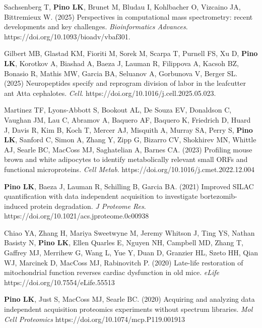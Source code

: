 \documentclass[11pt]{article}
\begin{document}
\begin{etaremune}

    \item Sachsenberg T, \textbf{Pino LK}, Brunet M, Bludau I, Kohlbacher O, Vizcaino JA, Bittremieux W. (2025) Perspectives in computational mass spectrometry: recent developments and key challenges. \textit{Bioinformatics Advances}. https://doi.org/10.1093/bioadv/vbaf301.

    \item Gilbert MB, Glastad KM, Fioriti M, Sorek M, Scarpa T, Purnell FS, Xu D, \textbf{Pino LK}, Korotkov A, Biashad A, Baeza J, Lauman R, Filippova A, Kacsoh BZ, Bonasio R, Mathis MW, Garcia BA, Seluanov A, Gorbunova V, Berger SL. (2025) Neuropeptides specify and reprogram division of labor in the leafcutter ant Atta cephalotes. \textit{Cell}. https://doi.org/10.1016/j.cell.2025.05.023.
    
    \item Martinez TF, Lyons-Abbott S, Bookout AL, De Souza EV, Donaldson C, Vaughan 
    JM, Lau C, Abramov A, Baquero AF, Baquero K, Friedrich D, Huard J, Davis R, Kim B, 
    Koch T, Mercer AJ, Misquith A, Murray SA, Perry S, \textbf{Pino LK}, Sanford C, 
    Simon A, Zhang Y, Zipp G, Bizarro CV, Shokhirev MN, Whittle AJ, Searle BC, MacCoss 
    MJ, Saghatelian A, Barnes CA. (2023) Profiling mouse brown and white adipocytes to 
    identify metabolically relevant small ORFs and functional microproteins. \textit{Cell 
    Metab}. https://doi.org/10.1016/j.cmet.2022.12.004

    \item \textbf{Pino LK}, Baeza J, Lauman R, Schilling B, Garcia BA. (2021) Improved 
    SILAC quantification with data independent acquisition to investigate 
    bortezomib-induced protein degradation. \textit{J Proteome Res}. 
    https://doi.org/10.1021/acs.jproteome.0c00938
    
    \item Chiao YA, Zhang H, Mariya Sweetwyne M, Jeremy Whitson J, Ting YS, Nathan Basisty
    N, \textbf{Pino LK}, Ellen Quarles E, Nguyen NH, Campbell MD, Zhang T, Gaffrey MJ, 
    Merrihew G, Wang L, Yue Y, Duan D, Granzier HL, Szeto HH, Qian WJ, Marcinek D, MacCoss 
    MJ, Rabinovitch P. (2020) Late-life restoration of mitochondrial function reverses 
    cardiac dysfunction in old mice. \textit{eLife} https://doi.org/10.7554/eLife.55513
    
    \item \textbf{Pino LK}, Just S, MacCoss MJ, Searle BC. (2020) Acquiring and analyzing 
    data independent acquisition proteomics experiments without spectrum libraries. 
    \textit{Mol Cell Proteomics} https://doi.org/10.1074/mcp.P119.001913
    

\end{etaremune}
\end{document}
